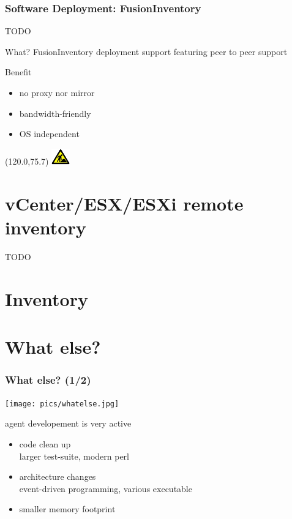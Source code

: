 \documentclass{beamer}
\newcommand{\WorkInProgress}{%
\begin{textblock}{14}(120.0,75.7)
\includegraphics[height=0.7cm]{./pics/workinprogress.jpg}
\end{textblock}
  }
\begin{document}
\begin{frame}
    \frametitle{Software Deployment: FusionInventory}
TODO
    \begin{block}{What?}
    FusionInventory deployment support featuring peer to peer support
    \end{block}

    \begin{block}{Benefit}
    \begin{itemize}
        \item no proxy nor mirror
        \item bandwidth-friendly
        \item OS independent
    \end{itemize}
    \end{block}

\WorkInProgress
\end{frame}


\section{vCenter/ESX/ESXi remote inventory}


\begin{frame}
TODO

\end{frame}



\section{Inventory}


\section{What else?}


\begin{frame}
    \frametitle{What else? (1/2)}

    \begin{center}
    \texttt{[image: pics/whatelse.jpg]}
    \end{center}

    \pause

    \begin{block}{agent developement is very active}
        \begin{itemize}
            \item code clean up\\
            {\small larger test-suite, modern perl}
            \item architecture changes\\
            {\small event-driven programming, various executable}
            \item smaller memory footprint
        \end{itemize}
    \end{block}
\end{frame}
\end{document}
